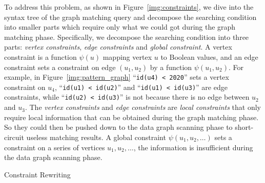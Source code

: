 To address this problem, as shown in Figure~\ref{img:constraints},
we dive into the syntax tree of the graph matching query and decompose the searching condition into smaller parts which require only what we could got during the graph matching phase.
Specifically, we decompose the searching condition into three parts: \emph{vertex constraints}, \emph{edge constraints} and \emph{global constraint}.
A vertex constraint is a function $\psi(u)$ mapping vertex $u$ to Boolean values,
and an edge constraint sets a constraint on edge $(u_1, u_2)$ by a function $\psi(u_1, u_2)$.
For example, in Figure~\ref{img:pattern_graph} ``\texttt{id(u4) < 2020}'' sets a vertex constraint on $u_4$,
``\texttt{id(u1) < id(u2)}'' and ``\texttt{id(u1) < id(u3)}'' are edge constraints,
while ``\texttt{id(u2) < id(u3)}'' is not because there is no edge between $u_2$ and $u_3$.
The \emph{vertex constraints} and \emph{edge constraints} are \emph{local constraints} that only require local information that can be obtained during the graph matching phase.
So they could then be pushed down to the data graph scanning phase to short-circuit useless matching results.
A global constraint $\psi(u_1, u_2, \dots)$ sets a constraint on a series of vertices $u_1, u_2, \dots$,
the information is insufficient during the data graph scanning phase.

\begin{algorithm}[ht]
  \caption{Constraint Rewriting}\label{alg:rewrite}
\end{algorithm}

